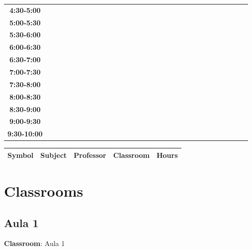 \documentclass{article}
\begin{document}
\begin{table}[ht]
\begin{tabular}{|c|c|c|c|c|c|c|c|c|c|c|c|c|c|c|c|c|c|c|c|c|c|c|c|c|c|c|c|c|c|}
 \cline{1-8} 
\textbf{4:30-5:00} &   &   &   &   &   &   &   \\
 \cline{1-8} 
\textbf{5:00-5:30} &   &   &   &   &   &   &   \\
 \cline{1-8} 
\textbf{5:30-6:00} &   &   &   &   &   &   &   \\
 \cline{1-8} 
\textbf{6:00-6:30} &   &   &   &   &   &   &   \\
 \cline{1-8} 
\textbf{6:30-7:00} &   &   &   &   &   &   &   \\
 \cline{1-8} 
\textbf{7:00-7:30} &   &   &   &   &   &   &   \\
 \cline{1-8} 
\textbf{7:30-8:00} &   &   &   &   &   &   &   \\
 \cline{1-8} 
\textbf{8:00-8:30} &   &   &   &   &   &   &   \\
 \cline{1-8} 
\textbf{8:30-9:00} &   &   &   &   &   &   &   \\
 \cline{1-8} 
\textbf{9:00-9:30} &   &   &   &   &   &   &   \\
 \cline{1-8} 
\textbf{9:30-10:00} &   &   &   &   &   &   &   \\
 \cline{1-8} 
\end{tabular}\end{table}

                        
        \begin{tabular}{|>{\centering\arraybackslash}m{2cm}|>{\centering\arraybackslash}m{4cm}|>{\centering\arraybackslash}m{4cm}|>{\centering\arraybackslash}m{3.5cm}|>{\centering\arraybackslash}m{3.5cm}|}
        \hline
        \textbf{Symbol} & \textbf{Subject} & \textbf{Professor} & \textbf{Classroom} & \textbf{Hours} \\
        \hline
        \end{tabular}
                    
                        
                        \newpage
                        
        
        \section{Classrooms} 

        \subsection{Aula 1}
        \vspace*{.1cm}
        
        \begin{flushright}
            {\LARGE \textbf{Classroom}: Aula 1}
        \end{flushright}
        \vspace{1cm}
\end{document}
